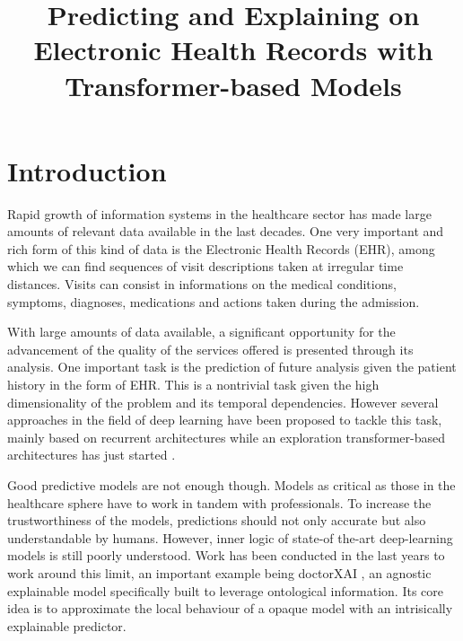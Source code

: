 \documentclass[]{marticle}
\title{\textbf{\huge Predicting and Explaining on Electronic Health Records with Transformer-based Models}}
\date{}
\begin{document}
\maketitle
\newpage

\tableofcontents
\newpage

\section{Introduction}

Rapid growth of information systems in the healthcare sector has made large amounts of relevant data
available in the last decades. One very important and rich form of this kind of data is the
Electronic Health Records (EHR), among which we can find sequences of visit descriptions taken at
irregular time distances. Visits can consist in informations on the medical conditions, symptoms,
diagnoses, medications and actions taken during the admission. 

With large amounts of data available, a significant opportunity for the advancement of the quality
of the services offered is presented through its analysis. One important task is the prediction of
future analysis given the patient history in the form of EHR. This is a nontrivial task given the
high dimensionality of the problem and its temporal dependencies. However several approaches in the
field of deep learning have been proposed to tackle this task, mainly based on recurrent
architectures  while an exploration transformer-based architectures has just started
.

Good predictive models are not enough though. Models as critical as those in the healthcare sphere
have to work in tandem with professionals. To increase the trustworthiness of the models,
predictions should not only accurate but also understandable by humans. However, inner logic of
state-of the-art deep-learning models is still poorly understood. Work has been conducted in the
last years to work around this limit, an important example being doctorXAI \cite{panigutti-xai}, an
agnostic explainable model specifically built to leverage ontological information. Its core idea is
to approximate the local behaviour of a opaque model with an intrisically explainable predictor.
\end{document}
